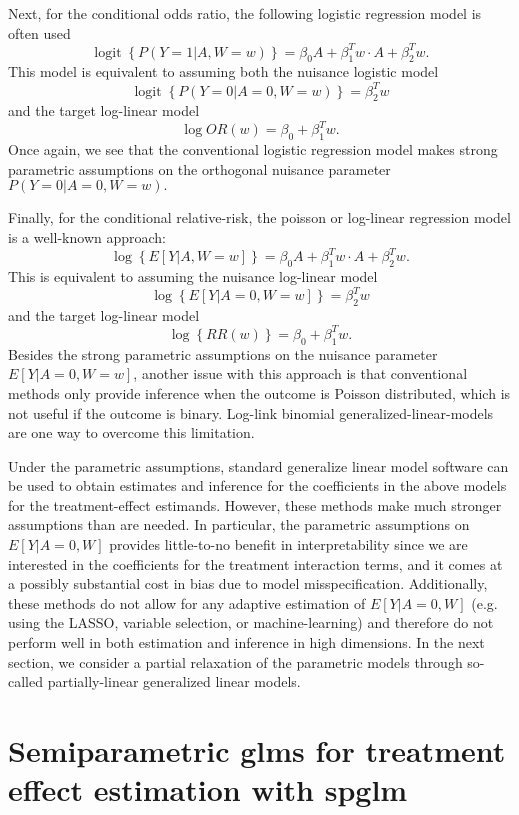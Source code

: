 \documentclass[article]{jss}
\DeclareMathOperator{\logit}{logit}
\begin{document}
Next, for the conditional odds ratio, the following logistic regression model is often used
$$\logit \left\{P(Y=1|A,W=w) \right\} =  \beta_0 A +  \beta_1^T w \cdot A + \beta_2^T w.$$
This model is equivalent to assuming both the nuisance logistic model
$$\logit\left\{P(Y=0|A=0,W=w) \right\} =   \beta_2^T w$$
and the target log-linear model
$$\log OR(w) =  \beta_0  +  \beta_1^T w. $$
Once again, we see that the conventional logistic regression model makes strong parametric assumptions on the orthogonal nuisance parameter $P(Y=0|A=0,W=w).$ 

Finally, for the conditional relative-risk, the poisson or log-linear regression model is a well-known approach:
$$\log \left\{E[Y|A,W=w] \right\} =  \beta_0 A +  \beta_1^T w \cdot A + \beta_2^T w.$$
This is equivalent to assuming the nuisance log-linear model
$$\log \left\{E[Y|A=0,W=w] \right\} = \beta_2^T w$$
and the target log-linear model
$$\log \left\{RR(w) \right\} =  \beta_0  +  \beta_1^T w. $$
Besides the strong parametric assumptions on the nuisance parameter $E[Y|A=0,W=w]$, another issue with this approach is that conventional methods only provide inference when the outcome is Poisson distributed, which is not useful if the outcome is binary. Log-link binomial generalized-linear-models are one way to overcome this limitation. 

Under the parametric assumptions, standard generalize linear model software can be used to obtain estimates and inference for the coefficients in the above models for the treatment-effect estimands. However, these methods make much stronger assumptions than are needed. In particular, the parametric assumptions on $E[Y|A=0,W]$ provides little-to-no benefit in interpretability since we are interested in the coefficients for the treatment interaction terms, and it comes at a possibly substantial cost in bias due to model misspecification. Additionally, these methods do not allow for any adaptive estimation of $E[Y|A=0,W]$ (e.g. using the LASSO, variable selection, or machine-learning) and therefore do not perform well in both estimation and inference in high dimensions. In the next section, we consider a partial relaxation of the parametric models through so-called partially-linear generalized linear models.




\section{Semiparametric glms for treatment effect estimation  with spglm}
\end{document}
